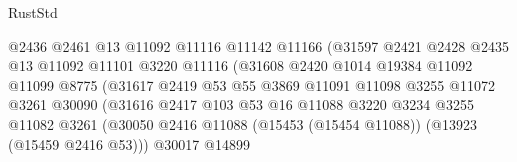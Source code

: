 \begin{lexlean}{RustStd}
\begin{coremodule}
                                      @2436
                                      @2461
                                      @13
                                      @11092
                                      @11116
                                      @11142
                                      @11166
                                      (@31597
                                        @2421
                                        @2428
                                        @2435
                                        @13
                                        @11092
                                        @11101
                                        @3220
                                        @11116
                                        (@31608
                                          @2420
                                          @1014
                                          @19384
                                          @11092
                                          @11099
                                          @8775
                                          (@31617
                                            @2419
                                            @53
                                            @55
                                            @3869
                                            @11091
                                            @11098
                                            @3255
                                            @11072
                                            @3261
                                            @30090
                                            (@31616
                                              @2417
                                              @103
                                              @53
                                              @16
                                              @11088
                                              @3220
                                              @3234
                                              @3255
                                              @11082
                                              @3261
                                              (@30050
                                                @2416
                                                @11088
                                                (@15453 (@15454 @11088))
                                                (@13923 (@15459 @2416 @53)))
                                              @30017
                                              @14899

\end{coremodule}
\end{lexlean}
